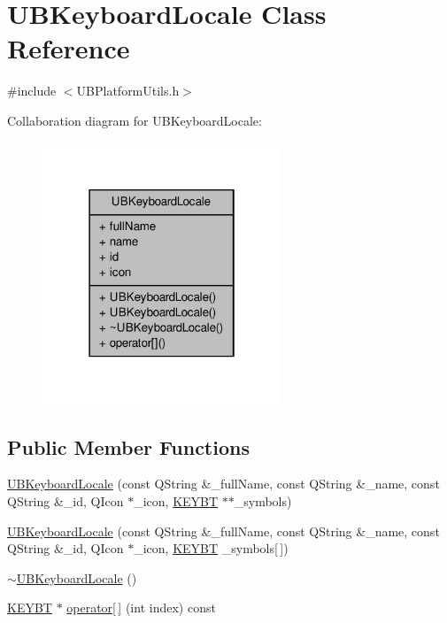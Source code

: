 \hypertarget{class_u_b_keyboard_locale}{\section{U\-B\-Keyboard\-Locale Class Reference}
\label{d3/d63/class_u_b_keyboard_locale}
}


{\ttfamily \#include $<$U\-B\-Platform\-Utils.\-h$>$}



Collaboration diagram for U\-B\-Keyboard\-Locale\-:
\nopagebreak
\begin{figure}[H]
\begin{center}
\leavevmode
\includegraphics[width=202pt]{df/d19/class_u_b_keyboard_locale__coll__graph}
\end{center}
\end{figure}
\subsection*{Public Member Functions}
\begin{DoxyCompactItemize}
\item 
\hyperlink{class_u_b_keyboard_locale_ae58a7c9f90dd5927870358525910ccf9}{U\-B\-Keyboard\-Locale} (const Q\-String \&\-\_\-full\-Name, const Q\-String \&\-\_\-name, const Q\-String \&\-\_\-id, Q\-Icon $\ast$\-\_\-icon, \hyperlink{struct_k_e_y_b_t}{K\-E\-Y\-B\-T} $\ast$$\ast$\-\_\-symbols)
\item 
\hyperlink{class_u_b_keyboard_locale_ab91f5ef78b12df45c6e996b00f7c1d86}{U\-B\-Keyboard\-Locale} (const Q\-String \&\-\_\-full\-Name, const Q\-String \&\-\_\-name, const Q\-String \&\-\_\-id, Q\-Icon $\ast$\-\_\-icon, \hyperlink{struct_k_e_y_b_t}{K\-E\-Y\-B\-T} \-\_\-symbols\mbox{[}$\,$\mbox{]})
\item 
\hyperlink{class_u_b_keyboard_locale_af34cc70f9ad430e9a5985b791cb13f0c}{$\sim$\-U\-B\-Keyboard\-Locale} ()
\item 
\hyperlink{struct_k_e_y_b_t}{K\-E\-Y\-B\-T} $\ast$ \hyperlink{class_u_b_keyboard_locale_aab46f577f08ee17e76bf04c543f9adb9}{operator\mbox{[}$\,$\mbox{]}} (int index) const 
\end{DoxyCompactItemize}
